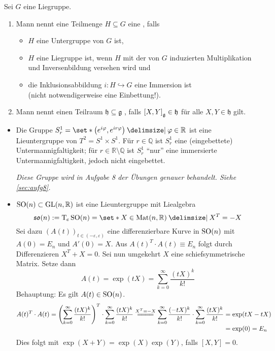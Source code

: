 \begin{definition}[{name=[{Lieuntergruppe und Lieunteralgebra}]}]
	Sei $G$ eine Liegruppe.
	\begin{enumerate}[1)]
		\item Mann nennt eine Teilmenge $H \subseteq G$ eine , falls 
		\begin{itemize}
			\item $H$ eine Untergruppe von $G$ ist,
			\item $H$ eine Liegruppe ist, wenn $H$ mit der von $G$ induzierten Multiplikation und Inversenbildung versehen wird und
			\item die Inklusionsabbildung $i \colon H \hookrightarrow G$ eine Immersion ist \\ 
			(nicht notwendigerweise eine Einbettung!).
		\end{itemize}
		\item Mann nennt einen Teilraum $\mathfrak{h} \subseteq \mathfrak{g}$ , falls $\benbrace*{X,Y}_\mathfrak{g} \in \mathfrak{h}$ für alle $X,Y \in \mathfrak{h}$ gilt.
	\end{enumerate}
\end{definition}

\begin{beispiel*}[{name=[Lieuntergruppen]}]
	\leavevmode
	\begin{itemize}
		\item Die Gruppe $S^1_r = \set*{\enbrace*{e^{i \varphi}, e^{i r \varphi}} \given \varphi \in \mathbb{R}}$ ist eine Lieuntergruppe von $T^2=S^1 \times S^1$.
		Für $r \in \mathbb{Q}$ ist $S^1_r$ eine (eingebettete) Untermannigfaltigkeit; für $r \in \mathbb{R}\setminus \mathbb{Q}$ ist $S^1_r$ \enquote{nur} eine immersierte Untermannigfaltigkeit, jedoch nicht eingebettet.
		
		\emph{Diese Gruppe wird in Aufgabe 8 der Übungen genauer behandelt. Siehe \cref{sec:aufg8}.}
		\item $\SO(n) \subset \GL(n,\mathbb{R})$ ist eine Lieuntergruppe mit Liealgebra 
		\[
			\mathfrak{so}(n) := \Tmap_e \SO(n) = \set*{X \in \Mat(n,\mathbb{R}) \given X^T=-X}
		\]
		Sei dazu $(A(t))_{t \in (-\varepsilon,\varepsilon)}$ eine differenzierbare Kurve in $\SO(n)$ mit $A(0)=E_n$ und $A'(0)=X$.
		Aus $A(t)^T \cdot A(t) \equiv E_n$ folgt durch Differenzieren $X^T + X =0$.
		Sei nun umgekehrt $X$ eine schiefsymmetrische Matrix.
		Setze dann 
		\[
			A(t) =\exp(t X) = \sum_{k=0}^{\infty} \frac{(tX)^k}{k!} 
		\]
		Behauptung: Es gilt $A(t) \in \SO(n)$.
		\begin{align}
			A(t)^T \cdot A(t) = \enbrace*{\sum_{k=0}^{\infty} \frac{(tX)^k}{k!} }^T \cdot \sum_{k=0}^{\infty} \frac{(tX)^k}{k!} \stackrel{X^T=-X}{=\joinrel=\joinrel=\joinrel=}\sum_{k=0}^{\infty} \frac{(-tX)^k}{k!}  \cdot \sum_{k=0}^{\infty} \frac{(tX)^k}{k!} 
			&= \exp(tX-tX) \\[-3pt]
			&= \exp(0) =E_n
		\end{align}
		Dies folgt mit $\exp(X+Y)= \exp(X) \exp(Y)$, falls $[X,Y]=0$.
	\end{itemize}
\end{beispiel*}

